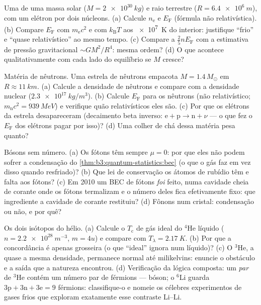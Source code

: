 \begin{exercise}[$\star\star$]\label{exo:b3:quantum-statistics:6}
Uma  de uma massa solar ($M = \qty{2e30}{kg}$) e raio
terrestre ($R = \qty{6.4e6}{m}$), com um elétron por dois núcleons. (a)
Calcule $n_{\text{e}}$ e $E_{\text{F}}$ (fórmula não
relativística). (b) Compare $E_{\text{F}}$ com $m_{\text{e}}c^2$ e
com $k_{\text{B}}T$ aos \qty{e7}{K} do interior: justifique
``frio'' e ``quase relativístico'' ao mesmo tempo. (c) Compare
a  $\tfrac25 nE_{\text{F}}$ com a
estimativa de pressão gravitacional $\sim GM^2/R^4$: mesma ordem? (d) O que acontece qualitativamente com
cada lado do equilíbrio se $M$ cresce?
\end{exercise}

\begin{exercise}[$\star\star$]\label{exo:b3:quantum-statistics:7}
Matéria de nêutrons. Uma estrela de nêutrons empacota $M = 1.4\,M_\odot$ em $R
\approx \qty{11}{km}$. (a) Calcule a densidade de nêutrons e
compare com a densidade nuclear ($\qty{2.3e17}{kg/m^3}$). (b) Calcule
$E_{\text{F}}$ para os nêutrons (não relativístico; $m_{\text{n}}c^2
= \qty{939}{MeV}$) e verifique quão relativísticos eles são. (c) Por que
os elétrons da estrela desapareceram (decaimento beta inverso:
$\text{e} + \text{p} \to \text{n} + \nu$ --- o que fez o
$E_{\text{F}}$ dos elétrons pagar por isso)? (d) Uma colher de chá dessa
matéria pesa quanto?
\end{exercise}

\begin{exercise}[$\star\star$]\label{exo:b3:quantum-statistics:8}
Bósons sem número. (a) Os fótons têm sempre $\mu = 0$: por que eles
não podem sofrer a condensação do
\cref{thm:b3:quantum-statistics:bec} (o que o gás faz em vez disso
quando resfriado)? (b) Que lei de conservação os átomos de rubídio têm
e falta aos fótons? (c) Em 2010 um BEC de fótons \emph{foi} feito, numa
cavidade cheia de corante onde os fótons termalizam e o número deles
fica efetivamente fixo: que ingrediente a cavidade de corante restituiu?
(d) Fônons num cristal: condensação ou não, e por quê?
\end{exercise}

\begin{exercise}[$\star\star$]\label{exo:b3:quantum-statistics:9}
Os dois isótopos do hélio. (a) Calcule o $T_{\text{c}}$ de gás ideal
do $^4$He líquido ($n = \qty{2.2e28}{m^{-3}}$, $m = 4u$) e
compare com $T_\lambda = \qty{2.17}{K}$. (b) Por que a concordância é
apenas grosseira (o que ``ideal'' ignora num líquido)? (c) O $^3$He, a
quase a mesma densidade, permanece normal até milikelvins: enuncie
o obstáculo e a saída que a natureza encontrou. (d) Verificação da lógica composta: um \emph{par} de $^3$He contém um número
par de férmions --- bóson; o $^6$Li guarda $3\text{p} + 3\text{n}
+ 3\text{e} = 9$ férmions: classifique-o e nomeie os célebres
experimentos de gases frios que exploram exatamente esse contraste Li--Li.
\end{exercise}

